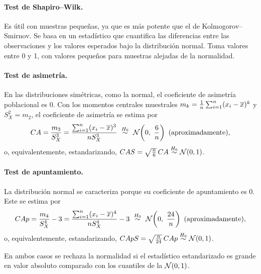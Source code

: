 \paragraph{Test de Shapiro--Wilk.} Es útil con muestras pequeñas, ya que es más potente que el de
Kolmogorov--Smirnov. Se basa en un estadístico que cuantifica las diferencias entre las
observaciones y los valores esperados bajo la distribución normal. Toma valores entre 0 y 1, con
valores pequeños para muestras alejadas de la normalidad.

\paragraph{Test de asimetría.}
En las distribuciones simétricas, como la normal, el coeficiente de
asimetría poblacional es 0. Con los momentos centrales muestrales
$m_k=\frac1n\sum_{i=1}^{n} (x_i-\overline{x})^k$ y $S_X^2=m_2$, el coeficiente de asimetría se estima por
\[
  CA = \frac{m_3}{S_X^3} = \frac{\sumi (x_i-\media{x})^3}{nS_X^3}
  \ \bajoHo\ \Normal\!\left(0,\ \frac6n\right) \ \text{(aproximadamente)},
\]
o, equivalentemente, estandarizando, $CAS=\sqrt{\frac n6}\,CA\overset{H_0}{\sim}\mathcal{N}(0,1)$.

\paragraph{Test de apuntamiento.} La distribución normal se caracteriza porque su coeficiente de
apuntamiento es 0. Este se estima por
\[
  CAp = \frac{m_4}{S_X^4}-3 = \frac{\sumi (x_i-\media{x})^4}{nS_X^4}-3
  \ \bajoHo\ \Normal\!\left(0,\ \frac{24}{n}\right) \ \text{(aproximadamente)},
\]
o, equivalentemente, estandarizando, $CApS=\sqrt{\frac{n}{24}}\,CAp\overset{H_0}{\sim}\mathcal{N}(0,1)$.

En ambos casos se rechaza la normalidad si el estadístico estandarizado es grande en valor
absoluto comparado con los cuantiles de la $\mathcal{N}(0,1)$.
